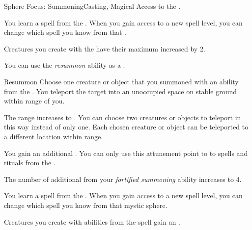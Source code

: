     \begin{feat}{Sphere Focus: Summoning}{Casting, Magical}
        \featpre Access to the  .

         You learn a spell from the  .
        When you gain access to a new spell level, you can change which spell you know from that .

         Creatures you create with the   have their maximum  increased by 2.

         You can use the \textit{resummon} ability as a .
        \begin{freeability}{Resummon}
            Choose one creature or object that you summoned with an ability from the  .
            You teleport the target into an unoccupied space on stable ground within \rngmed range of you.

            \rankline
             The range increases to \rnglong.
             You can choose two creatures or objects to teleport in this way instead of only one.
                Each chosen creature or object can be teleported to a different location within range.
        \end{freeability}

         You gain an additional .
        You can only use this attunement point to  to spells and rituals from the  .

         The number of additional  from your \textit{fortified summoning} ability increases to 4.

         You learn a spell from the  .
        When you gain access to a new spell level, you can change which spell you know from that mystic sphere.

         Creatures you create with abilities from the  spell gain an .
    \end{feat}

